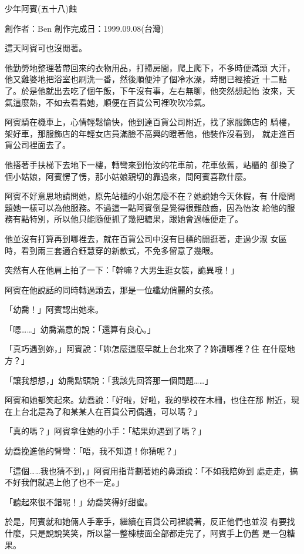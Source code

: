 



少年阿賓(五十八)蝕

創作者：Ben
創作完成日：1999.09.08(台灣)　


這天阿賓可也沒閒著。

他勤勞地整理著帶回來的衣物用品，打掃房間，爬上爬下，不多時便滿頭
大汗，他又雞婆地把浴室也刷洗一番，然後順便沖了個冷水澡，時間已經接近
十二點了。於是他就出去吃了個午飯，下午沒有事，左右無聊，他突然想起怡
汝來，天氣這麼熱，不如去看看她，順便在百貨公司裡吹吹冷氣。

阿賓騎在機車上，心情輕鬆愉快，他到達百貨公司附近，找了家服飾店的
騎樓，架好車，那服飾店的年輕女店員滿臉不高興的瞪著他，他裝作沒看到，
就走進百貨公司裡面去了。

他搭著手扶梯下去地下一樓，轉彎來到怡汝的花車前，花車依舊，站櫃的
卻換了個小姑娘，阿賓愣了愣，那小姑娘親切的靠過來，問阿賓喜歡什麼。

阿賓不好意思地請問她，原先站櫃的小姐怎麼不在？她說她今天休假，有
什麼問題她一樣可以為他服務。不過這一點阿賓倒是覺得很難啟齒，因為怡汝
給他的服務有點特別，所以他只能隨便抓了幾把糖果，跟她會過帳便走了。

他並沒有打算再到哪裡去，就在百貨公司中沒有目標的閒逛著，走過少淑
女區時，看到兩三套適合鈺慧穿的新款式，不免多留意了幾眼。

突然有人在他肩上拍了一下：「幹嘛？大男生逛女裝，詭異哦！」

阿賓在他說話的同時轉過頭去，那是一位纖幼俏麗的女孩。

「幼喬！」阿賓認出她來。

「嗯……」幼喬滿意的說：「還算有良心。」

「真巧遇到妳，」阿賓說：「妳怎麼這麼早就上台北來了？妳讀哪裡？住
在什麼地方？」

「讓我想想，」幼喬點頭說：「我該先回答那一個問題……」

阿賓和她都笑起來。幼喬說：「好啦，好啦，我的學校在木柵，也住在那
附近，現在上台北是為了和某某人在百貨公司偶遇，可以嗎？」

「真的嗎？」阿賓拿住她的小手：「結果妳遇到了嗎？」

幼喬挽進他的臂彎：「唔，我不知道！你猜呢？」

「這個……我也猜不到，」阿賓用指背劃著她的鼻頭說：「不如我陪妳到
處走走，搞不好我們就遇上他了也不一定。」

「聽起來很不錯呢！」幼喬笑得好甜蜜。

於是，阿賓就和她倆人手牽手，繼續在百貨公司裡繞著，反正他們也並沒
有要找什麼，只是說說笑笑，所以當一整棟樓面全部都走完了，阿賓手上仍舊
是一包糖果。

